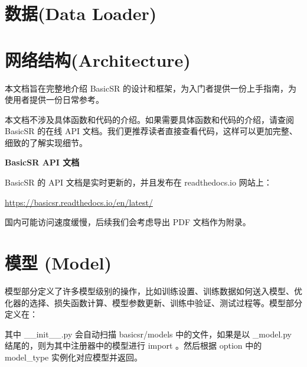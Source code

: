 \documentclass[../main.tex]{subfiles}
\begin{document}


\section{数据(Data Loader)}

\section{网络结构(Architecture)}


本文档旨在完整地介绍 BasicSR 的设计和框架，为入门者提供一份上手指南，为使用者提供一份日常参考。

本文档不涉及具体函数和代码的介绍。如果需要具体函数和代码的介绍，请查阅 BasicSR 的在线 API 文档。我们更推荐读者直接查看代码，这样可以更加完整、细致的了解实现细节。

\begin{hl} %
	\textbf{BasicSR API 文档}

	BasicSR 的 API 文档是实时更新的，并且发布在 readthedocs.io 网站上：

	\url{https://basicsr.readthedocs.io/en/latest/}

	国内可能访问速度缓慢，后续我们会考虑导出 PDF 文档作为附录。
\end{hl}

\section{模型 (Model)}

模型部分定义了许多模型级别的操作，比如训练设置、训练数据如何送入模型、优化器的选择、损失函数计算、模型参数更新、训练中验证、测试过程等。模型部分定义在：

其中 \_\_init\_\_.py 会自动扫描 basicsr/models 中的文件，如果是以 \_model.py 结尾的，则为其中注册器中的模型进行 import 。然后根据 option 中的 model\_type 实例化对应模型并返回。
\end{document}
